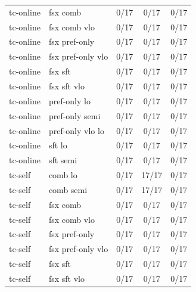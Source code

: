 \documentclass[10pt,landscape]{article}
\begin{document}
\begin{tabular}{llccc}
tc-online & fsx comb & \cellcolor{missing}0/17 & \cellcolor{missing}0/17 & \cellcolor{missing}0/17 \\
tc-online & fsx comb vlo & \cellcolor{missing}0/17 & \cellcolor{missing}0/17 & \cellcolor{missing}0/17 \\
tc-online & fsx pref-only & \cellcolor{missing}0/17 & \cellcolor{missing}0/17 & \cellcolor{missing}0/17 \\
tc-online & fsx pref-only vlo & \cellcolor{missing}0/17 & \cellcolor{missing}0/17 & \cellcolor{missing}0/17 \\
tc-online & fsx sft & \cellcolor{missing}0/17 & \cellcolor{missing}0/17 & \cellcolor{missing}0/17 \\
tc-online & fsx sft vlo & \cellcolor{missing}0/17 & \cellcolor{missing}0/17 & \cellcolor{missing}0/17 \\
tc-online & pref-only lo & \cellcolor{missing}0/17 & \cellcolor{missing}0/17 & \cellcolor{missing}0/17 \\
tc-online & pref-only semi & \cellcolor{missing}0/17 & \cellcolor{missing}0/17 & \cellcolor{missing}0/17 \\
tc-online & pref-only vlo lo & \cellcolor{missing}0/17 & \cellcolor{missing}0/17 & \cellcolor{missing}0/17 \\
tc-online & sft lo & \cellcolor{missing}0/17 & \cellcolor{missing}0/17 & \cellcolor{missing}0/17 \\
tc-online & sft semi & \cellcolor{missing}0/17 & \cellcolor{missing}0/17 & \cellcolor{missing}0/17 \\
tc-self & comb lo & \cellcolor{missing}0/17 & \cellcolor{done}17/17 & \cellcolor{missing}0/17 \\
tc-self & comb semi & \cellcolor{missing}0/17 & \cellcolor{done}17/17 & \cellcolor{missing}0/17 \\
tc-self & fsx comb & \cellcolor{missing}0/17 & \cellcolor{missing}0/17 & \cellcolor{missing}0/17 \\
tc-self & fsx comb vlo & \cellcolor{missing}0/17 & \cellcolor{missing}0/17 & \cellcolor{missing}0/17 \\
tc-self & fsx pref-only & \cellcolor{missing}0/17 & \cellcolor{missing}0/17 & \cellcolor{missing}0/17 \\
tc-self & fsx pref-only vlo & \cellcolor{missing}0/17 & \cellcolor{missing}0/17 & \cellcolor{missing}0/17 \\
tc-self & fsx sft & \cellcolor{missing}0/17 & \cellcolor{missing}0/17 & \cellcolor{missing}0/17 \\
tc-self & fsx sft vlo & \cellcolor{missing}0/17 & \cellcolor{missing}0/17 & \cellcolor{missing}0/17 \\

\end{tabular}
\end{document}
